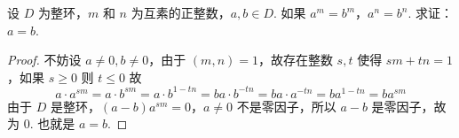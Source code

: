 \begin{exercise}[注意环的乘法不包含可逆性]
设 $D$ 为整环，$m$ 和 $n$ 为互素的正整数，$a, b\in D$. 如果 $a^{m}=b^{m}$，$a^{n}=b^{n}$. 求证：$a=b$.
\end{exercise}
\begin{proof}
不妨设 $a\neq0,b\neq0$，由于 $(m,n)=1$，故存在整数 $s,t$ 使得 $sm+tn=1$，如果 $s\geq0$ 则 $t\leq0$ 故
\[
a\cdot a^{sm}=a\cdot b^{sm}=a\cdot b^{1-tn}=ba\cdot b^{-tn}=ba\cdot a^{-tn}= ba ^{1-tn}=b a^{sm}
\]
由于 $D$ 是整环，$(a-b)a^{sm}=0$，$a\neq0$ 不是零因子，所以 $a-b$ 是零因子，故为 0. 也就是 $a=b$.
\end{proof}
